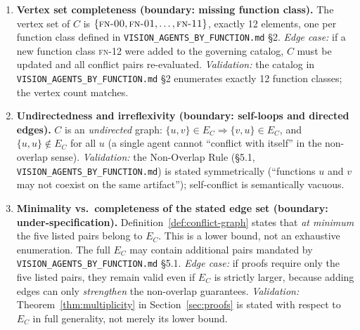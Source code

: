 \documentclass[12pt]{article}
\theoremstyle{definition}
\newcommand{\code}[1]{\texttt{#1}}
\newcommand{\FN}[1]{\textsc{fn-#1}}
\newcommand{\VisionFunc}{\code{VISION\_AGENTS\_\allowbreak BY\_FUNCTION.md}}
\begin{document}
\begin{enumerate}[label=\textbf{C\arabic*.}, leftmargin=*, widest=C9]

  \item \textbf{Vertex set completeness (boundary: missing function
        class).}
        The vertex set of $C$ is
        $\{\FN{00}, \FN{01}, \ldots, \FN{11}\}$, exactly 12 elements,
        one per function class defined in \VisionFunc{} \S2.
        \emph{Edge case:} if a new function class \FN{12} were added
        to the governing catalog, $C$ must be updated and all conflict
        pairs re-evaluated.
        \emph{Validation:} the catalog in \VisionFunc{} \S2 enumerates
        exactly 12 function classes; the vertex count matches.

  \item \textbf{Undirectedness and irreflexivity (boundary: self-loops
        and directed edges).}
        $C$ is an \emph{undirected} graph:
        $\{u,v\} \in E_C \Rightarrow \{v,u\} \in E_C$, and
        $\{u,u\} \notin E_C$ for all $u$ (a single agent cannot
        ``conflict with itself'' in the non-overlap sense).
        \emph{Validation:} the Non-Overlap Rule (\S5.1, \VisionFunc{})
        is stated symmetrically (``functions $u$ and $v$ may not
        coexist on the same artifact''); self-conflict is
        semantically vacuous.

  \item \textbf{Minimality vs.\ completeness of the stated edge set
        (boundary: under-specification).}
        Definition~\ref{def:conflict-graph} states that
        \emph{at minimum} the five listed pairs belong to $E_C$.
        This is a lower bound, not an exhaustive enumeration.
        The full $E_C$ may contain additional pairs mandated by
        \VisionFunc{} \S5.1.
        \emph{Edge case:} if proofs require only the five listed
        pairs, they remain valid even if $E_C$ is strictly larger,
        because adding edges can only \emph{strengthen} the
        non-overlap guarantees.
        \emph{Validation:} Theorem~\ref{thm:multiplicity} in
        Section~\ref{sec:proofs} is stated with respect to
        $E_C$ in full generality, not merely its lower bound.


\end{enumerate}
\end{document}
